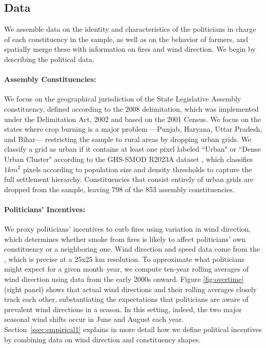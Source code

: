 \documentclass[12pt]{article}
\begin{document}
\subsection{Data\label{ssec:data1}}

We assemble data on the identity and characteristics of the politicians in charge of each constituency in the sample, as well as on the behavior of farmers, and spatially merge these with information on fires and wind direction. We begin by describing the political data.

\paragraph{Assembly Constituencies:} We focus on the geographical jurisdiction of the State Legislative Assembly constituency, defined according to the 2008 delimitation, which was implemented under the Delimitation Act, 2002 \citep{delimitation_act_2002} and
based on the 2001 Census. We focus on the states where crop burning is a major problem ---Punjab, Haryana, Uttar Pradesh, and Bihar--- restricting the sample to rural areas by dropping urban grids. We classify a grid as urban if it contains at least one pixel labeled ``Urban" or ``Dense Urban Cluster" according to the GHS-SMOD R2023A dataset \citep{ghs2023smodR2023}, which classifies
$1km^2$ pixels according to population size and density thresholds to capture the full settlement
hierarchy. Constituencies that consist entirely of urban grids are dropped from the sample, leaving 798 of the 853 assembly constituencies. 



\paragraph{Politicians' Incentives:} We proxy politicians' incentives to curb fires using variation in wind direction, which determines whether smoke from fires is likely to affect politicians' own constituency or a neighboring one. Wind direction and speed data come from the \citet{munozsabater2019era5landmonthly}, which is precise at a 25x25 km resolution. To approximate what politicians might expect for a given month–year, we compute ten-year rolling averages of wind direction using data from the early 2000s onward. Figure \ref{fig:overtime} (right panel) shows that actual wind directions and their rolling averages closely track each other, substantiating the expectations that politicians are aware of prevalent wind directions in a season. In this setting, indeed, the two major seasonal wind shifts occur in June and August each year. Section~\ref{ssec:empirical1} explains in more detail how we define political incentives by combining data on wind direction and constituency shapes.
\end{document}
